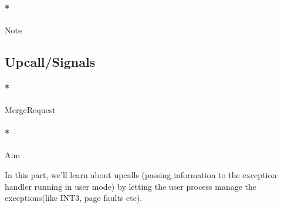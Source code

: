 \documentclass[]{article}
\newenvironment{Shaded}{}{}
\newcommand{\ExtensionTok}[1]{{#1}}
\newcommand{\NormalTok}[1]{{#1}}
\let\oldparagraph\paragraph
\renewcommand{\paragraph}[1]{\oldparagraph{#1}\mbox{}}
\begin{document}
\paragraph*{Note}\label{note-12}

\subsection{Upcall/Signals}\label{upcallsignals}

\paragraph*{MergeRequest}\label{mergerequest-11}

\begin{Shaded}
\end{Shaded}

\paragraph*{Aim}\label{aim-11}

In this part, we'll learn about upcalls (passing information to the
exception handler running in user mode) by letting the user process
manage the exceptions(like INT3, page faults etc).
\end{document}
